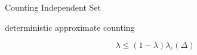 \documentclass{beamer}
\begin{document}
\begin{frame}{Counting Independent Set}
  \centerline{deterministic approximate counting}

  \[
    \lambda \le (1 - \lambda) \lambda_{c}(\Delta)
  \]
\end{frame}
\end{document}
